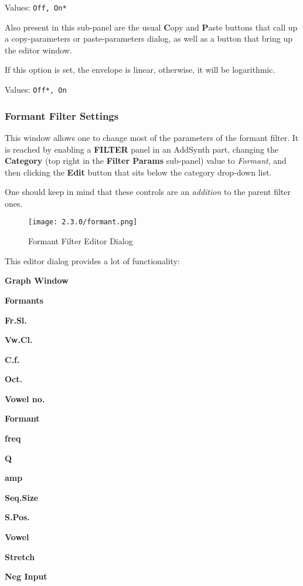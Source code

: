    Values: \texttt{Off, On*}

   Also present in this sub-panel are the usual \textbf{C}opy
   and \textbf{P}aste buttons that call up a copy-parameters or
   paste-parameters dialog, as well as a button that bring up the editor
   window.


   If this option is set, the envelope is linear, otherwise, it will be
   logarithmic.

   Values: \texttt{Off*, On}

\subsubsection{Formant Filter Settings}
\label{subsubsec:formant_filter_settings}

   This window allows one to change most of the parameters of the formant
   filter.   It is reached by enabling a \textbf{FILTER} panel in an AddSynth
   part,
   changing the \textbf{Category} (top right in the \textbf{Filter Params}
   sub-panel) value to \textsl{Formant}, and then clicking
   the \textbf{Edit} button that sits below the category drop-down list.

   One should keep in mind that these controls are an \textsl{addition} to the
   parent filter ones.

\begin{figure}[H]
   \centering
   \texttt{[image: 2.3.0/formant.png]}
   \caption[Formant Filter Editor]{Formant Filter Editor Dialog}
   \label{fig:formant_filter_editor}
\end{figure}

   This editor dialog provides a lot of functionality:

   \begin{enumber}
      \item \textbf{Graph Window}
      \item \textbf{Formants}
      \item \textbf{Fr.Sl.}
      \item \textbf{Vw.Cl.}
      \item \textbf{C.f.}
      \item \textbf{Oct.}
      \item \textbf{Vowel no.}
      \item \textbf{Formant}
      \item \textbf{freq}
      \item \textbf{Q}
      \item \textbf{amp}
      \item \textbf{Seq.Size}
      \item \textbf{S.Pos.}
      \item \textbf{Vowel}
      \item \textbf{Stretch}
      \item \textbf{Neg Input}
   \end{enumber}

